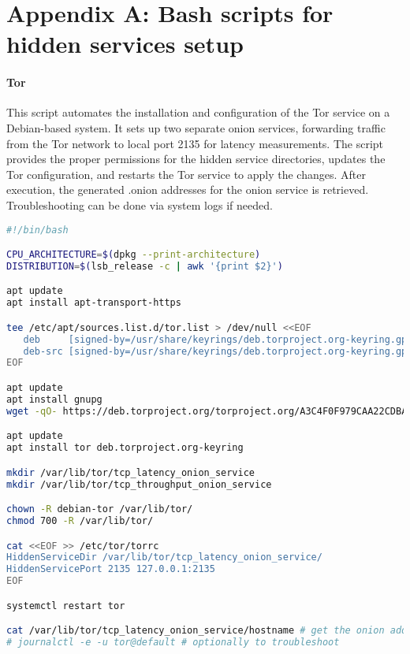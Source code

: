 \chapter*{Appendix A: Bash scripts for hidden services setup}
\label{chap:AppendixA}

\subsubsection{Tor}
This script automates the installation and configuration of the Tor service on a Debian-based system. It sets up two separate onion services, forwarding traffic from the Tor network to local port 2135 for latency measurements. The script provides the proper permissions for the hidden service directories, updates the Tor configuration, and restarts the Tor service to apply the changes. After execution, the generated .onion addresses for the onion service is retrieved. Troubleshooting can be done via system logs if needed.

\footnotesize
\begin{lstlisting}[language=bash, breaklines=true, breakatwhitespace=true, showstringspaces=false]
#!/bin/bash

CPU_ARCHITECTURE=$(dpkg --print-architecture)
DISTRIBUTION=$(lsb_release -c | awk '{print $2}')

apt update
apt install apt-transport-https

tee /etc/apt/sources.list.d/tor.list > /dev/null <<EOF
   deb     [signed-by=/usr/share/keyrings/deb.torproject.org-keyring.gpg] https://deb.torproject.org/torproject.org $DISTRIBUTION main
   deb-src [signed-by=/usr/share/keyrings/deb.torproject.org-keyring.gpg] https://deb.torproject.org/torproject.org $DISTRIBUTION main
EOF

apt update
apt install gnupg
wget -qO- https://deb.torproject.org/torproject.org/A3C4F0F979CAA22CDBA8F512EE8CBC9E886DDD89.asc | gpg --dearmor | tee /usr/share/keyrings/deb.torproject.org-keyring.gpg >/dev/null

apt update
apt install tor deb.torproject.org-keyring

mkdir /var/lib/tor/tcp_latency_onion_service
mkdir /var/lib/tor/tcp_throughput_onion_service

chown -R debian-tor /var/lib/tor/
chmod 700 -R /var/lib/tor/

cat <<EOF >> /etc/tor/torrc
HiddenServiceDir /var/lib/tor/tcp_latency_onion_service/
HiddenServicePort 2135 127.0.0.1:2135
EOF

systemctl restart tor

cat /var/lib/tor/tcp_latency_onion_service/hostname # get the onion address for the latency app
# journalctl -e -u tor@default # optionally to troubleshoot
\end{lstlisting}
\normalsize

